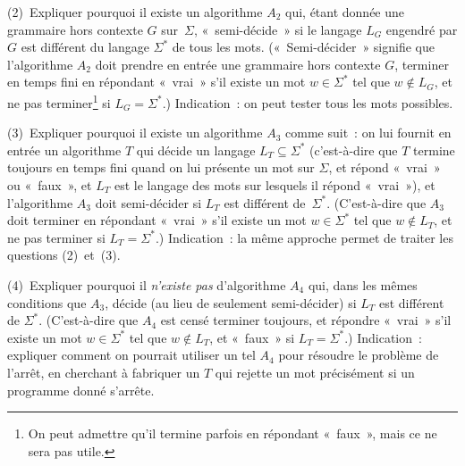 \documentclass[12pt,a4paper]{article}
\theoremstyle{definition}
\begin{document}
(2) Expliquer pourquoi il existe un algorithme $A_2$ qui, étant donnée
une grammaire hors contexte $G$ sur $\Sigma$, « semi-décide » si le
langage $L_G$ engendré par $G$ est différent du langage $\Sigma^*$ de
tous les mots.  (« Semi-décider » signifie que l'algorithme $A_2$ doit
prendre en entrée une grammaire hors contexte $G$, terminer en temps
fini en répondant « vrai » s'il existe un mot $w\in\Sigma^*$ tel que
$w\not\in L_G$, et ne pas terminer\footnote{On peut admettre qu'il
  termine parfois en répondant « faux », mais ce ne sera pas utile.}
si $L_G = \Sigma^*$.)  Indication : on peut tester tous les mots
possibles.

(3) Expliquer pourquoi il existe un algorithme $A_3$ comme suit : on
lui fournit en entrée un algorithme $T$ qui décide un langage $L_T
\subseteq \Sigma^*$ (c'est-à-dire que $T$ termine toujours en temps
fini quand on lui présente un mot sur $\Sigma$, et répond « vrai » ou
« faux », et $L_T$ est le langage des mots sur lesquels il répond
« vrai »), et l'algorithme $A_3$ doit semi-décider si $L_T$ est
différent de $\Sigma^*$.  (C'est-à-dire que $A_3$ doit terminer en
répondant « vrai » s'il existe un mot $w\in\Sigma^*$ tel que $w\not\in
L_T$, et ne pas terminer si $L_T = \Sigma^*$.)  Indication : la même
approche permet de traiter les questions (2) et (3).

(4) Expliquer pourquoi il \emph{n'existe pas} d'algorithme $A_4$ qui,
dans les mêmes conditions que $A_3$, décide (au lieu de seulement
semi-décider) si $L_T$ est différent de $\Sigma^*$.  (C'est-à-dire que
$A_4$ est censé terminer toujours, et répondre « vrai » s'il existe un
mot $w\in\Sigma^*$ tel que $w\not\in L_T$, et « faux » si $L_T =
\Sigma^*$.)  Indication : expliquer comment on pourrait utiliser un
tel $A_4$ pour résoudre le problème de l'arrêt, en cherchant à
fabriquer un $T$ qui rejette un mot précisément si un programme donné
s'arrête.
\end{document}
